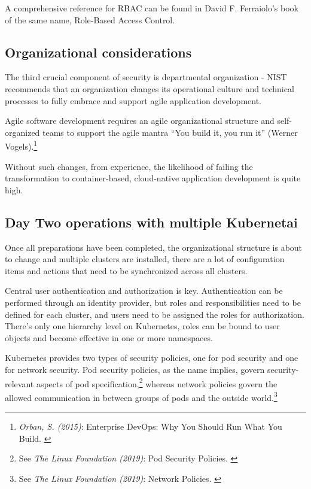 A comprehensive reference for RBAC can be found in David F. Ferraiolo's book of the same name, Role-Based Access Control\cite{rbac}.

\subsection{Organizational considerations}

The third crucial component of security is departmental organization - NIST recommends that an organization changes its operational culture and technical processes to fully embrace and support agile application development.

Agile software development requires an agile organizational structure and self-organized teams to support the agile mantra “You build it, you run it” (Werner Vogels).\footnote{\textit{Orban, S. (2015)}: Enterprise DevOps: Why You Should Run What You Build. \cite{devOps}}

Without such changes, from experience, the likelihood of failing the transformation to container-based, cloud-native application development is quite high.

\subsection{Day Two operations with multiple Kubernetai}

Once all preparations have been completed, the organizational structure is about to change and multiple clusters are installed, there are a lot of configuration items and actions that need to be synchronized across all clusters.

Central user authentication and authorization is key. Authentication can be performed through an identity provider, but roles and responsibilities need to be defined for each cluster, and users need to be assigned the roles for authorization. There's only one hierarchy level on Kubernetes, roles can be bound to user objects and become effective in one or more namespaces.

Kubernetes provides two types of security policies, one for pod security and one for network security. Pod security policies, as the name implies, govern security-relevant aspects of pod specification,\footnote{See \textit{The Linux Foundation (2019)}: Pod Security Policies. \cite{podSecurity}} whereas network policies govern the allowed communication in between groups of pods and the outside world.\footnote{See \textit{The Linux Foundation (2019)}: Network Policies. \cite{netSecurity}}

